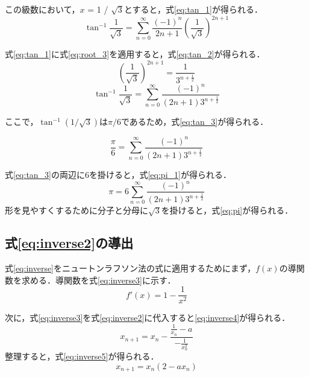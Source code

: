 \documentclass[a4paper,11pt,dvipdfmx]{jsarticle}
\begin{document}
この級数において，$x$ = 1 / $\sqrt{3}$とすると，式\eqref{eq:tan_1}が得られる．
\begin{equation}
  \label{eq:tan_1}
  \tan^{-1} \frac{1}{\sqrt{3}} = \sum_{n=0}^{\infty} \frac{(-1)^n}{2n+1} \left(\frac{1}{\sqrt{3}}\right)^{2n+1}
\end{equation}

式\eqref{eq:tan_1}に式\eqref{eq:root_3}を適用すると，式\eqref{eq:tan_2}が得られる．
\begin{equation}
  \label{eq:root_3}
  \left(\frac{1}{\sqrt{3}}\right)^{2n+1} = \frac{1}{3^{n + \frac{1}{2}}}
\end{equation}
\begin{equation}
  \label{eq:tan_2}
  \tan^{-1} \frac{1}{\sqrt{3}} = \sum_{n=0}^{\infty} \frac{(-1)^n}{(2n+1)3^{n+\frac{1}{2}}}
\end{equation}

ここで，$\tan^{-1} (1 / \sqrt{3})$は$\pi / 6$であるため，式\eqref{eq:tan_3}が得られる．

\begin{equation}
  \label{eq:tan_3}
  \frac{\pi}{6} =  \sum_{n=0}^{\infty} \frac{(-1)^n}{(2n+1)3^{n+\frac{1}{2}}}
\end{equation}

式\eqref{eq:tan_3}の両辺に6を掛けると，式\eqref{eq:pi_1}が得られる．
\begin{equation}
  \label{eq:pi_1}
  \pi = 6 \sum_{n=0}^{\infty} \frac{(-1)^n}{(2n+1)3^{n+\frac{1}{2}}}
\end{equation}
形を見やすくするために分子と分母に$\sqrt{3}$を掛けると，式\eqref{eq:pi}が得られる．

\subsection{式\ref{eq:inverse2}の導出}
\label{sec:inverse}
式\eqref{eq:inverse}をニュートンラフソン法の式に適用するためにまず，$f(x)$の導関数を求める．導関数を式\eqref{eq:inverse3}に示す．
\begin{equation}
  \label{eq:inverse3}
  f'(x) = 1 - \frac{1}{x^2}
\end{equation}

次に，式\eqref{eq:inverse3}を式\eqref{eq:inverse2}に代入すると\eqref{eq:inverse4}が得られる．
\begin{equation}
  \label{eq:inverse4}
    x_{n+1} = x_n - \frac{\frac{1}{x_n}-a}{-\frac{1}{x_n^2}}
\end{equation}
整理すると，式\eqref{eq:inverse5}が得られる．
\begin{equation}
  \label{eq:inverse5}
    x_{n+1} = x_n(2 - a x_n)
\end{equation}
\end{document}
